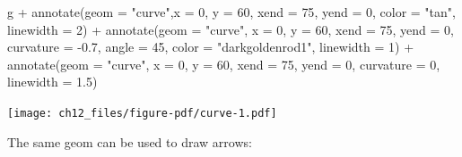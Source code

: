 \documentclass[
  letterpaper,
]{scrbook}
\newenvironment{Shaded}{\begin{snugshade}}{\end{snugshade}}
\newcommand{\AttributeTok}[1]{\textcolor[rgb]{0.40,0.45,0.13}{#1}}
\newcommand{\DecValTok}[1]{\textcolor[rgb]{0.68,0.00,0.00}{#1}}
\newcommand{\FloatTok}[1]{\textcolor[rgb]{0.68,0.00,0.00}{#1}}
\newcommand{\FunctionTok}[1]{\textcolor[rgb]{0.28,0.35,0.67}{#1}}
\newcommand{\NormalTok}[1]{\textcolor[rgb]{0.00,0.23,0.31}{#1}}
\newcommand{\SpecialCharTok}[1]{\textcolor[rgb]{0.37,0.37,0.37}{#1}}
\newcommand{\StringTok}[1]{\textcolor[rgb]{0.13,0.47,0.30}{#1}}
\begin{document}
\begin{Shaded}
\begin{Highlighting}[]
\NormalTok{g }\SpecialCharTok{+}
  \FunctionTok{annotate}\NormalTok{(}\AttributeTok{geom =} \StringTok{"curve"}\NormalTok{,}\AttributeTok{x =} \DecValTok{0}\NormalTok{, }\AttributeTok{y =} \DecValTok{60}\NormalTok{, }\AttributeTok{xend =} \DecValTok{75}\NormalTok{, }\AttributeTok{yend =} \DecValTok{0}\NormalTok{,}
             \AttributeTok{color =} \StringTok{"tan"}\NormalTok{, }\AttributeTok{linewidth =} \DecValTok{2}\NormalTok{) }\SpecialCharTok{+}
  \FunctionTok{annotate}\NormalTok{(}\AttributeTok{geom =} \StringTok{"curve"}\NormalTok{, }
           \AttributeTok{x =} \DecValTok{0}\NormalTok{, }\AttributeTok{y =} \DecValTok{60}\NormalTok{, }\AttributeTok{xend =} \DecValTok{75}\NormalTok{, }\AttributeTok{yend =} \DecValTok{0}\NormalTok{,}
             \AttributeTok{curvature =} \SpecialCharTok{{-}}\FloatTok{0.7}\NormalTok{, }\AttributeTok{angle =} \DecValTok{45}\NormalTok{,}
             \AttributeTok{color =} \StringTok{"darkgoldenrod1"}\NormalTok{, }\AttributeTok{linewidth =} \DecValTok{1}\NormalTok{) }\SpecialCharTok{+}
  \FunctionTok{annotate}\NormalTok{(}\AttributeTok{geom =} \StringTok{"curve"}\NormalTok{, }\AttributeTok{x =} \DecValTok{0}\NormalTok{, }\AttributeTok{y =} \DecValTok{60}\NormalTok{, }\AttributeTok{xend =} \DecValTok{75}\NormalTok{, }\AttributeTok{yend =} \DecValTok{0}\NormalTok{,}
             \AttributeTok{curvature =} \DecValTok{0}\NormalTok{, }\AttributeTok{linewidth =} \FloatTok{1.5}\NormalTok{)}
\end{Highlighting}
\end{Shaded}

\texttt{[image: ch12\_files/figure-pdf/curve-1.pdf]}

The same geom can be used to draw arrows:
\end{document}
